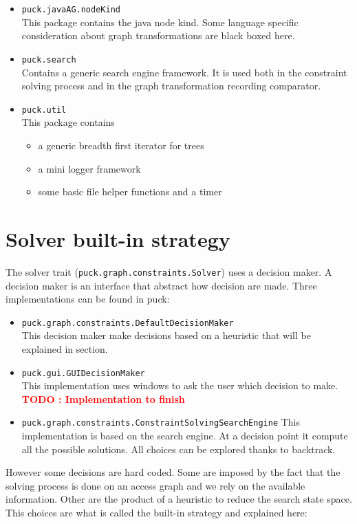 \documentclass[]{article}
\newcommand{\todo}[1]{\textcolor{red}{\textbf{TODO : #1}}}
\begin{document}
\begin{itemize}
\item \verb|puck.javaAG.nodeKind|\\
	This package contains the java node kind. Some language specific consideration about graph transformations are black boxed here.

\item \verb|puck.search|\\
	Contains a generic search engine framework. It is used both in the constraint solving process and in the graph transformation recording comparator.

\item \verb|puck.util|\\
This package contains 
\begin{itemize}
\item a generic breadth first iterator for trees
\item a mini logger framework
\item some basic file helper functions and a timer
\end{itemize}
\end{itemize}


\section{Solver built-in strategy}
The solver trait (\verb|puck.graph.constraints.Solver|) uses a decision maker. A decision maker is an interface that abstract how decision are made. Three implementations can be found in puck:
\begin{itemize}
	\item \verb|puck.graph.constraints.DefaultDecisionMaker|\\
	This decision maker make decisions based on a heuristic that will be explained in section.
	\item \verb|puck.gui.GUIDecisionMaker|\\
	This implementation uses windows to ask the user which decision to make. \todo{Implementation to finish}
	\item \verb|puck.graph.constraints.ConstraintSolvingSearchEngine|
	This implementation is based on the search engine. At a decision point it compute all the possible solutions. All choices can be explored thanks to backtrack.
\end{itemize}

However some decisions are hard coded. Some are imposed by the fact that the solving process is done on an access graph and we rely on the available information.
Other are the product of a heuristic to reduce the search state space. This choices are what is called the built-in strategy and explained here:
\end{document}
